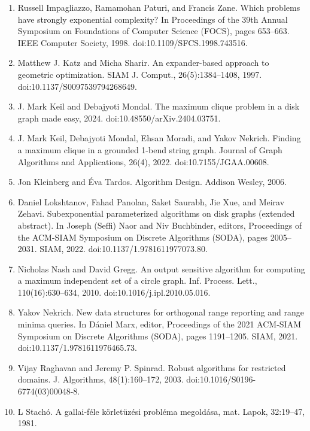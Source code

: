 \begin{enumerate}
\item[]  [30]  Russell Impagliazzo, Ramamohan Paturi, and Francis Zane.  Which problems have strongly exponential complexity?  In Proceedings of the 39th Annual Symposium on Foundations of Computer Science (FOCS), pages 653–663. IEEE Computer Society, 1998.  doi:10.1109/SFCS.1998.743516.  
\item[]  [31]  Matthew J. Katz and Micha Sharir.  An expander-based approach to geometric optimization.  SIAM J. Comput., 26(5):1384–1408, 1997.  doi:10.1137/S0097539794268649.  
\item[]  [32]  J. Mark Keil and Debajyoti Mondal.  The maximum clique problem in a disk graph made easy, 2024.  doi:10.48550/arXiv.2404.03751.  
\item[]  [33]  J. Mark Keil, Debajyoti Mondal, Ehsan Moradi, and Yakov Nekrich.  Finding a maximum clique in a grounded 1-bend string graph.  Journal of Graph Algorithms and Applications, 26(4), 2022.  doi:10.7155/JGAA.00608.  
\item[]  [34]  Jon Kleinberg and Éva Tardos.  Algorithm Design.  Addison Wesley, 2006.  
\item[]  [35]  Daniel Lokshtanov, Fahad Panolan, Saket Saurabh, Jie Xue, and Meirav Zehavi.  Subexponential parameterized algorithms on disk graphs (extended abstract).  In Joseph (Seffi) Naor and Niv Buchbinder, editors, Proceedings of the ACM-SIAM Symposium on Discrete Algorithms (SODA), pages 2005–2031. SIAM, 2022.  doi:10.1137/1.9781611977073.80.  
\item[]  [36]  Nicholas Nash and David Gregg.  An output sensitive algorithm for computing a maximum independent set of a circle graph.  Inf. Process. Lett., 110(16):630–634, 2010.  doi:10.1016/j.ipl.2010.05.016.  
\item[]  [37]  Yakov Nekrich.  New data structures for orthogonal range reporting and range minima queries.  In Dániel Marx, editor, Proceedings of the 2021 ACM-SIAM Symposium on Discrete Algorithms (SODA), pages 1191–1205. SIAM, 2021.  doi:10.1137/1.9781611976465.73.  
\item[]  [38]  Vijay Raghavan and Jeremy P. Spinrad.  Robust algorithms for restricted domains.  J. Algorithms, 48(1):160–172, 2003.  doi:10.1016/S0196-6774(03)00048-8.  
\item[]  [39]  L Stachó.  A gallai-féle körletüzési probléma megoldása, mat.  Lapok, 32:19–47, 1981.  
\end{enumerate}
\par
